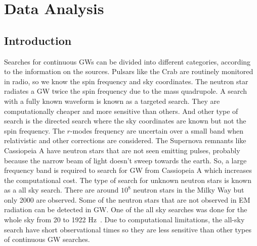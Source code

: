 \documentclass{ttuthes2007}
\begin{document}

\chapter{\textbf{Data Analysis}}
\section{Introduction}
Searches for continuous \acp{GW} can be divided into different categories,
according to the information on the sources. Pulsars like the Crab are routinely
monitored in radio, so we know the spin frequency and sky coordinates. The
neutron star radiates a \ac{GW} twice the spin frequency due to the mass
quadrupole. A search with a fully known waveform is known as a targeted search.
They are computationally cheaper and more sensitive than others. And other type
of search is the directed search where the sky coordinates are known but not the
spin frequency. The $r$-modes frequency are uncertain over a small band when
relativistic and other corrections are considered. The Supernova remnants like
Cassiopeia A have neutron stars that are not seen emitting pulses, probably
because the narrow beam of light doesn't sweep towards the earth. So, a large
frequency band is required to search for \ac{GW} from Cassiopeia A which
increases the computational cost. The type of search for unknown neutron stars
is known as a all sky search. There are around $10^8$ neutron stars in the Milky
Way but only 2000 are observed. Some of the neutron stars that are not observed
in \ac{EM} radiation can be detected in \ac{GW}. One of the all sky searches
was done for the whole sky from 20 to 1922 Hz~\cite{Abbott_2019a}. Due to
computational limitations, the all-sky search have short observational times so
they are less sensitive than other types of continuous \ac{GW} searches.
\end{document}
